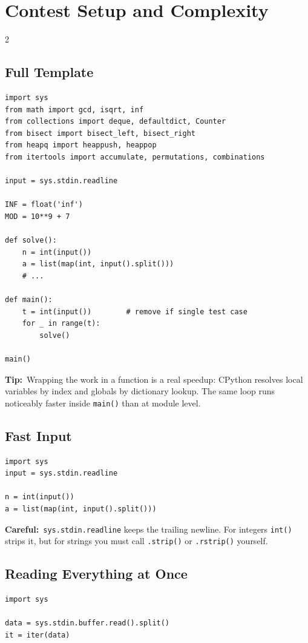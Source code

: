 \documentclass[10pt]{article}
\newcommand{\code}[1]{\texttt{\small #1}}
\newcommand{\tip}[1]{{\color{tipc}\footnotesize\textbf{Tip:}}~{\footnotesize #1}\par}
\newcommand{\warn}[1]{{\color{warnc}\footnotesize\textbf{Careful:}}~{\footnotesize #1}\par}
\begin{document}
\section{Contest Setup and Complexity}
\begin{multicols}{2}

\subsection{Full Template}
\begin{lstlisting}
import sys
from math import gcd, isqrt, inf
from collections import deque, defaultdict, Counter
from bisect import bisect_left, bisect_right
from heapq import heappush, heappop
from itertools import accumulate, permutations, combinations

input = sys.stdin.readline

INF = float('inf')
MOD = 10**9 + 7

def solve():
    n = int(input())
    a = list(map(int, input().split()))
    # ...

def main():
    t = int(input())        # remove if single test case
    for _ in range(t):
        solve()

main()
\end{lstlisting}
\tip{Wrapping the work in a function is a real speedup: CPython resolves
local variables by index and globals by dictionary lookup. The same loop
runs noticeably faster inside \code{main()} than at module level.}

\subsection{Fast Input}
\begin{lstlisting}
import sys
input = sys.stdin.readline

n = int(input())
a = list(map(int, input().split()))
\end{lstlisting}
\warn{\code{sys.stdin.readline} keeps the trailing newline. For integers
\code{int()} strips it, but for strings you must call
\code{.strip()} or \code{.rstrip()} yourself.}

\subsection{Reading Everything at Once}
\begin{lstlisting}
import sys

data = sys.stdin.buffer.read().split()
it = iter(data)


\end{lstlisting}
\end{multicols}
\end{document}
